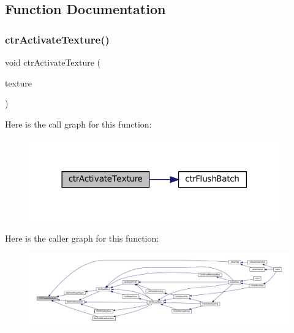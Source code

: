 \subsection{Function Documentation}
\mbox{\label{ctr-gpu_8h_aad6f8dfb30a010444bf5c7420904d852}} 
\subsubsection{\texorpdfstring{ctr\+Activate\+Texture()}{ctrActivateTexture()}}
{\footnotesize\ttfamily void ctr\+Activate\+Texture (\begin{DoxyParamCaption}\item[{const C3\+D\+\_\+\+Tex $\ast$}]{texture }\end{DoxyParamCaption})}

Here is the call graph for this function\+:
\nopagebreak
\begin{figure}[H]
\begin{center}
\leavevmode
\includegraphics[width=306pt]{ctr-gpu_8h_aad6f8dfb30a010444bf5c7420904d852_cgraph}
\end{center}
\end{figure}
Here is the caller graph for this function\+:
\nopagebreak
\begin{figure}[H]
\begin{center}
\leavevmode
\includegraphics[width=350pt]{ctr-gpu_8h_aad6f8dfb30a010444bf5c7420904d852_icgraph}
\end{center}
\end{figure}
\mbox{\label{ctr-gpu_8h_a5a8136bc8fce40ba12da3cfaaa617bd4}} 
